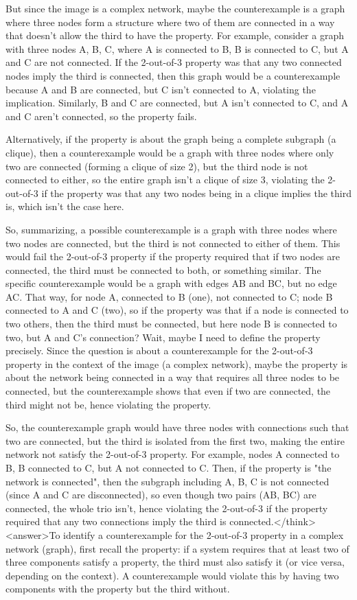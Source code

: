 But since the image is a complex network, maybe the counterexample is a graph where three nodes form a structure where two of them are connected in a way that doesn't allow the third to have the property. For example, consider a graph with three nodes A, B, C, where A is connected to B, B is connected to C, but A and C are not connected. If the 2-out-of-3 property was that any two connected nodes imply the third is connected, then this graph would be a counterexample because A and B are connected, but C isn't connected to A, violating the implication. Similarly, B and C are connected, but A isn't connected to C, and A and C aren't connected, so the property fails.

Alternatively, if the property is about the graph being a complete subgraph (a clique), then a counterexample would be a graph with three nodes where only two are connected (forming a clique of size 2), but the third node is not connected to either, so the entire graph isn't a clique of size 3, violating the 2-out-of-3 if the property was that any two nodes being in a clique implies the third is, which isn't the case here.

So, summarizing, a possible counterexample is a graph with three nodes where two nodes are connected, but the third is not connected to either of them. This would fail the 2-out-of-3 property if the property required that if two nodes are connected, the third must be connected to both, or something similar. The specific counterexample would be a graph with edges AB and BC, but no edge AC. That way, for node A, connected to B (one), not connected to C; node B connected to A and C (two), so if the property was that if a node is connected to two others, then the third must be connected, but here node B is connected to two, but A and C's connection? Wait, maybe I need to define the property precisely. Since the question is about a counterexample for the 2-out-of-3 property in the context of the image (a complex network), maybe the property is about the network being connected in a way that requires all three nodes to be connected, but the counterexample shows that even if two are connected, the third might not be, hence violating the property.

So, the counterexample graph would have three nodes with connections such that two are connected, but the third is isolated from the first two, making the entire network not satisfy the 2-out-of-3 property. For example, nodes A connected to B, B connected to C, but A not connected to C. Then, if the property is "the network is connected", then the subgraph including A, B, C is not connected (since A and C are disconnected), so even though two pairs (AB, BC) are connected, the whole trio isn't, hence violating the 2-out-of-3 if the property required that any two connections imply the third is connected.</think><answer>To identify a counterexample for the 2-out-of-3 property in a complex network (graph), first recall the property: if a system requires that at least two of three components satisfy a property, the third must also satisfy it (or vice versa, depending on the context). A counterexample would violate this by having two components with the property but the third without.  

